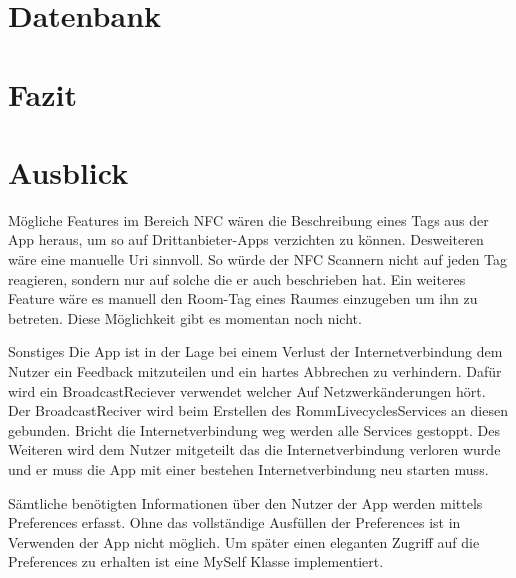 \section{Datenbank}
\label{sec:Datenbank}
\section{Fazit}
\label{sec:Fazit}
\section{Ausblick}
\label{sec:Ausblick}
Mögliche Features im Bereich NFC wären die Beschreibung eines Tags aus der App heraus, um so auf Drittanbieter-Apps verzichten zu können. Desweiteren wäre eine manuelle Uri sinnvoll. So würde der NFC Scannern nicht auf jeden Tag reagieren, sondern nur auf solche die er auch beschrieben hat. Ein weiteres Feature wäre es manuell den Room-Tag eines Raumes einzugeben um ihn zu betreten. Diese Möglichkeit gibt es momentan noch nicht.

Sonstiges
Die App ist in der Lage bei einem Verlust der Internetverbindung dem Nutzer ein Feedback mitzuteilen und ein hartes Abbrechen zu verhindern. Dafür wird ein BroadcastReciever verwendet welcher Auf Netzwerkänderungen hört. Der BroadcastReciver wird beim Erstellen des RommLivecyclesServices an diesen gebunden. Bricht die Internetverbindung weg werden alle Services gestoppt. Des Weiteren wird dem Nutzer mitgeteilt das die Internetverbindung verloren wurde und er muss die App mit einer bestehen Internetverbindung neu starten muss.

Sämtliche benötigten Informationen über den Nutzer der App werden mittels Preferences erfasst. Ohne das vollständige Ausfüllen der Preferences ist in Verwenden der App nicht möglich. Um später einen eleganten Zugriff auf die Preferences zu erhalten ist eine MySelf Klasse implementiert.

